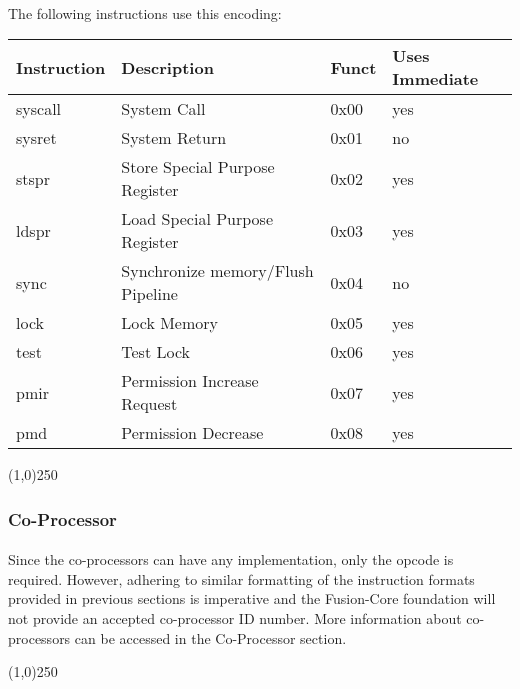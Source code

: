 \documentclass[letterpaper, 11pt]{article}
\begin{document}
\paragraph{}The following instructions use this encoding: \\
\begin{center}
	\begin{tabular}{|l|l|l|l|} \hline
			Instruction & Description 						& Funct & Uses Immediate\\ \hline
			syscall		& System Call						& 0x00  & yes \\ \hline
			sysret		& System Return						& 0x01  & no  \\ \hline
			stspr		& Store Special Purpose Register	& 0x02  & yes \\ \hline
			ldspr		& Load Special Purpose Register		& 0x03  & yes \\ \hline
			sync		& Synchronize memory/Flush Pipeline  & 0x04  & no  \\ \hline
			lock		& Lock Memory						& 0x05  & yes \\ \hline
			test		& Test Lock 						& 0x06  & yes \\ \hline
			pmir		& Permission Increase Request		& 0x07  & yes \\ \hline
			pmd			& Permission Decrease				& 0x08  & yes \\ \hline


\end{tabular}
\end{center}
\begin{center}
	\line(1,0){250}
\end{center}
\newpage
\subsubsection{Co-Processor}

\paragraph{}Since the co-processors can have any implementation, only the opcode is required. However, adhering to similar 
formatting of the instruction formats provided in previous sections is imperative and the Fusion-Core foundation 
will not provide an accepted co-processor ID number. More information about co-processors can be accessed in the Co-Processor section.
\begin{center}
	\line(1,0){250}
\end{center}
\end{document}
